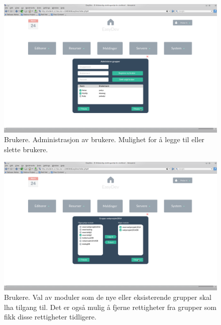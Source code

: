 \begin{figure}[ht]
\includegraphics[width=\textwidth,height=\textheight,keepaspectratio]{./img/prosessdokumentasjon/hifi/b3.png}
\caption[Hi-fi Brukere 3]{Brukere. Administrasjon av brukere. Mulighet for å legge til eller slette brukere.}
\label{fig:brukerehi3}
\end{figure}

\begin{figure}[ht]
\includegraphics[width=\textwidth,height=\textheight,keepaspectratio]{./img/prosessdokumentasjon/hifi/b4.png}
\caption[Hi-fi Brukere 4]{Brukere. Val av moduler som de nye eller eksisterende grupper skal lha tilgang til. Det er også mulig å fjerne rettigheter fra grupper som fikk disse rettigheter tidligere.}
\label{fig:brukerehi4}
\end{figure}